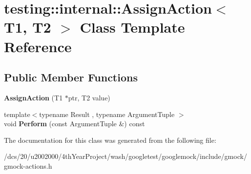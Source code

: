 \hypertarget{classtesting_1_1internal_1_1AssignAction}{}\section{testing\+:\+:internal\+:\+:Assign\+Action$<$ T1, T2 $>$ Class Template Reference}
\label{classtesting_1_1internal_1_1AssignAction}
\subsection*{Public Member Functions}
\begin{DoxyCompactItemize}
\item 
\mbox{\label{classtesting_1_1internal_1_1AssignAction_ae5a8fe8954ff3f8b26a08b57c3afdf9a}} 
{\bfseries Assign\+Action} (T1 $\ast$ptr, T2 value)
\item 
\mbox{\label{classtesting_1_1internal_1_1AssignAction_a540912bec1f4de6fc4c7de26312e4586}} 
{\footnotesize template$<$typename Result , typename Argument\+Tuple $>$ }\\void {\bfseries Perform} (const Argument\+Tuple \&) const
\end{DoxyCompactItemize}


The documentation for this class was generated from the following file\+:\begin{DoxyCompactItemize}
\item 
/dcs/20/u2002000/4th\+Year\+Project/wash/googletest/googlemock/include/gmock/gmock-\/actions.\+h\end{DoxyCompactItemize}
